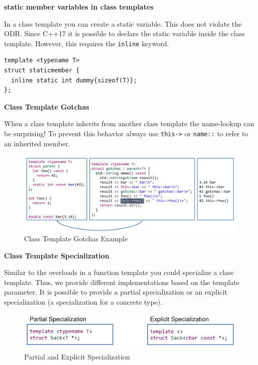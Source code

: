 \documentclass[11pt,twoside,landscape]{article}
\begin{document}
\begin{multicols}{3}
\textbf{static member variables in class templates}

In a class template you can create a static variable.
This does not violate the ODR.
Since C++17 it is possible to declare the static variable inside the class template.
However, this requires the \texttt{inline} keyword.


\lstset{language=c++,label= ,caption= ,captionpos=b,numbers=none}
\begin{lstlisting}
template <typename T>
struct staticmember {
  inline static int dummy{sizeof(T)};
};
\end{lstlisting}

\textbf{Class Template Gotchas}

When a class template inherits from another class template the name-lookup can be surprising!
To prevent this behavior always use \texttt{this->} or \texttt{name::} to refer to an inherited member.

\begin{figure}[htbp]
\centering
\includegraphics[width=.9\linewidth]{img/class_template_gotchas.png}
\caption{Class Template Gotchas Example}
\end{figure}

\textbf{Class Template Specialization}

Similar to the overloads in a function template you could specialize a class template.
Thus, we provide different implementations based on the template parameter.
It is possible to provide a partial specialization or an explicit specialization (a specialization for a concrete type).

\begin{figure}[htbp]
\centering
\includegraphics[width=.9\linewidth]{img/partial_explicit_specialization.png}
\caption{Partial and Explicit Specialization}
\end{figure}


\end{multicols}
\end{document}
